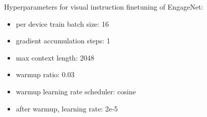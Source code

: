 




Hyperparameters for visual instruction finetuning of EngageNet: 
\begin{itemize}
    \item per device train batch size: 16
    \item gradient accumulation steps: 1
    \item max context length: 2048
    \item warmup ratio: 0.03
    \item warmup learning rate scheduler: cosine
    \item after warmup, learning rate: 2e-5
\end{itemize}



